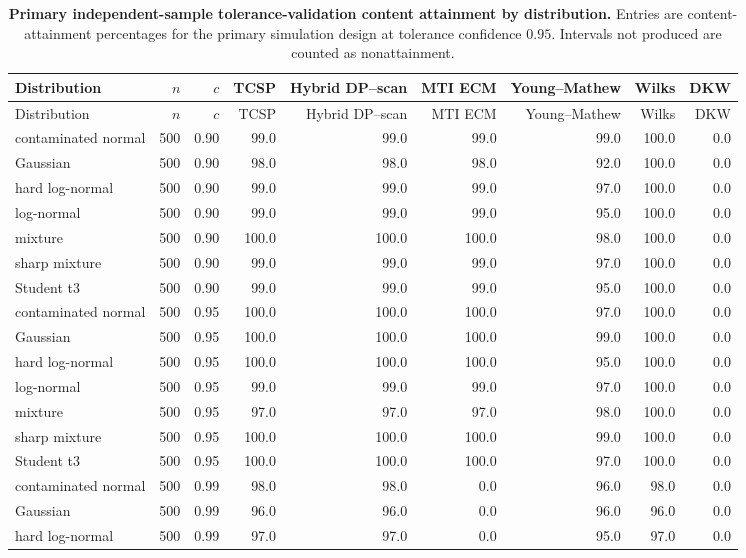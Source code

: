 \begin{longtable}{@{}p{}rrrrrrrr@{}}
\caption{\textbf{Primary independent-sample tolerance-validation content attainment by distribution.} Entries are content-attainment percentages for the primary simulation design at tolerance confidence \(0.95\). Intervals not produced are counted as nonattainment.}\label{tab:supp-primary-dgp-delivery}\\
\toprule
Distribution & \(n\) & \(c\) & TCSP & Hybrid DP--scan & MTI ECM & Young--Mathew & Wilks & DKW
\\
\midrule
\endfirsthead
\toprule
Distribution & \(n\) & \(c\) & TCSP & Hybrid DP--scan & MTI ECM & Young--Mathew & Wilks & DKW
\\
\midrule
\endhead
contaminated normal & 500 & 0.90 & 99.0 & 99.0 & 99.0 & 99.0 & 100.0 & 0.0
\\
Gaussian & 500 & 0.90 & 98.0 & 98.0 & 98.0 & 92.0 & 100.0 & 0.0
\\
hard log-normal & 500 & 0.90 & 99.0 & 99.0 & 99.0 & 97.0 & 100.0 & 0.0
\\
log-normal & 500 & 0.90 & 99.0 & 99.0 & 99.0 & 95.0 & 100.0 & 0.0
\\
mixture & 500 & 0.90 & 100.0 & 100.0 & 100.0 & 98.0 & 100.0 & 0.0
\\
sharp mixture & 500 & 0.90 & 99.0 & 99.0 & 99.0 & 97.0 & 100.0 & 0.0
\\
Student t3 & 500 & 0.90 & 99.0 & 99.0 & 99.0 & 95.0 & 100.0 & 0.0
\\
contaminated normal & 500 & 0.95 & 100.0 & 100.0 & 100.0 & 97.0 & 100.0 & 0.0
\\
Gaussian & 500 & 0.95 & 100.0 & 100.0 & 100.0 & 99.0 & 100.0 & 0.0
\\
hard log-normal & 500 & 0.95 & 100.0 & 100.0 & 100.0 & 95.0 & 100.0 & 0.0
\\
log-normal & 500 & 0.95 & 99.0 & 99.0 & 99.0 & 97.0 & 100.0 & 0.0
\\
mixture & 500 & 0.95 & 97.0 & 97.0 & 97.0 & 98.0 & 100.0 & 0.0
\\
sharp mixture & 500 & 0.95 & 100.0 & 100.0 & 100.0 & 99.0 & 100.0 & 0.0
\\
Student t3 & 500 & 0.95 & 100.0 & 100.0 & 100.0 & 97.0 & 100.0 & 0.0
\\
contaminated normal & 500 & 0.99 & 98.0 & 98.0 & 0.0 & 96.0 & 98.0 & 0.0
\\
Gaussian & 500 & 0.99 & 96.0 & 96.0 & 0.0 & 96.0 & 96.0 & 0.0
\\
hard log-normal & 500 & 0.99 & 97.0 & 97.0 & 0.0 & 95.0 & 97.0 & 0.0

\end{longtable}

